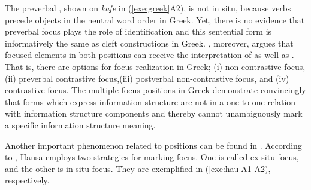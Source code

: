 

\noindent The preverbal , shown on \textit{kafe} in
(\ref{exe:greek}A2), is not in situ, because verbs precede
objects in the neutral word order in Greek.  Yet, there is no evidence
that preverbal focus plays the role of identification and this
sentential form is informatively the same as cleft constructions in
Greek.  \citeauthor{gryllia:09}, moreover, argues that focused
elements in both positions can receive the interpretation of
 as well as .
That is, there are options for focus realization in Greek; (i) 
non-contrastive focus, (ii) preverbal contrastive focus,(iii)
postverbal non-contrastive focus, and (iv) 
contrastive focus. The multiple focus positions in Greek demonstrate
convincingly that forms which express information structure are not in
a one-to-one relation with information structure components and
thereby cannot unambiguously mark a specific information structure
meaning.









Another important phenomenon related to  positions can be found
in .  According to \citet{hartmann:zimmermann:07}, Hausa
employs two strategies for marking focus. One is called ex
  situ focus, and the other is in situ focus. They are
exemplified in (\ref{exe:hau}A1-A2), respectively.


